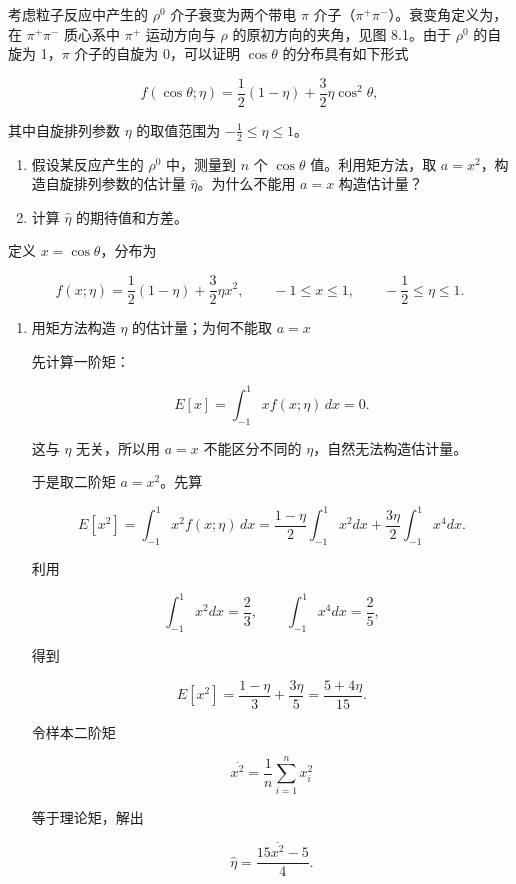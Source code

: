 \begin{question}
考虑粒子反应中产生的 \(\rho^0\) 介子衰变为两个带电 \(\pi\)
介子（\(\pi^+\pi^-\)）。衰变角定义为，在 \(\pi^+\pi^-\) 质心系中
\(\pi^+\) 运动方向与 \(\rho\) 的原初方向的夹角，见图 8.1。由于
\(\rho^0\) 的自旋为 1，\(\pi\) 介子的自旋为 0，可以证明 \(\cos\theta\)
的分布具有如下形式


\[
f(\cos\theta;\eta)=\frac12(1-\eta)+\frac32\eta\cos^2\theta,
\]

其中自旋排列参数 \(\eta\) 的取值范围为 \(-\frac12\le\eta\le1\)。

\begin{enumerate}
\item
  假设某反应产生的 \(\rho^0\) 中，测量到 \(n\) 个 \(\cos\theta\)
  值。利用矩方法，取 \(a=x^2\)，构造自旋排列参数的估计量
  \(\hat\eta\)。为什么不能用 \(a=x\) 构造估计量？
\item
  计算 \(\hat\eta\) 的期待值和方差。
\end{enumerate}
\begin{solution}
定义 \(x=\cos\theta\)，分布为

\[
f(x;\eta)=\frac12(1-\eta)+\frac32\eta x^2,
\qquad -1\le x\le 1,
\qquad -\frac12\le\eta\le 1.
\]

\begin{enumerate}
\item 用矩方法构造 \(\eta\) 的估计量；为何不能取 \(a=x\)

先计算一阶矩：

\[
E[x]=\int_{-1}^1 x f(x;\eta)\,dx = 0.
\]

这与 \(\eta\) 无关，所以用 \(a=x\) 不能区分不同的
\(\eta\)，自然无法构造估计量。

于是取二阶矩 \(a=x^2\)。先算

\[
E[x^2]=\int_{-1}^1 x^2 f(x;\eta)\,dx
=\frac{1-\eta}{2}\int_{-1}^1 x^2dx + \frac{3\eta}{2}\int_{-1}^1 x^4dx.
\]

利用

\[
\int_{-1}^1 x^2dx=\frac23,
\qquad
\int_{-1}^1 x^4dx=\frac25,
\]

得到

\[
E[x^2]=\frac{1-\eta}{3}+\frac{3\eta}{5}=\frac{5+4\eta}{15}.
\]

令样本二阶矩

\[
\overline{x^2}=\frac1n\sum_{i=1}^n x_i^2
\]

等于理论矩，解出

\[
\hat\eta = \frac{15\overline{x^2}-5}{4}.
\]


\end{enumerate}
\end{solution}
\end{question}
